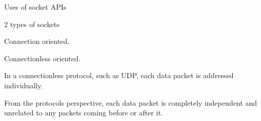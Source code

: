 Uses of socket APIs

2 types of sockets


\begin{DoxyEnumerate}
\item Connection oriented.
\item Connectionless oriented.
\end{DoxyEnumerate}

In a connectionless protocol, such as UDP, each data packet is addressed individually.

From the protocol\textquotesingle{}s perspective, each data packet is completely independent and unrelated to any packets coming before or after it. 